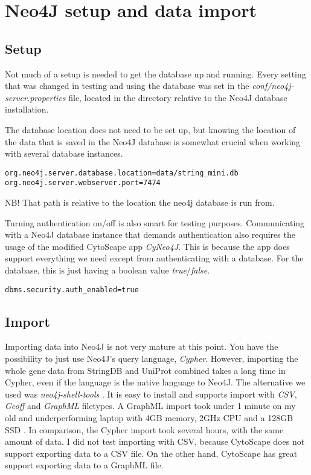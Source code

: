 \section{Neo4J setup and data import}

\subsection{Setup}
Not much of a setup is needed to get the database up and running. Every setting
that was changed in testing and using the database was set in the
\textit{conf/neo4j-server.properties} file, located in the directory relative to
the Neo4J database installation.

The database
location does not need to be set up, but knowing the location of the data that
is saved in the Neo4J database is somewhat crucial when working with several
database instances.

\begin{verbatim}
org.neo4j.server.database.location=data/string_mini.db
org.neo4j.server.webserver.port=7474
\end{verbatim}

NB! That path is relative to the location the neo4j database is run from.

Turning authentication on/off is also smart for testing purposes. Communicating
with a Neo4J database instance that demands authentication also requires the
usage of the modified CytoScape app \textit{CyNeo4J}. This is because the app
does support everything we need except from authenticating with a database. For
the database, this is just having a boolean value \textit{true}/\textit{false}.

\begin{verbatim}
dbms.security.auth_enabled=true
\end{verbatim}

\subsection{Import}
Importing data into Neo4J is not very mature at this point. You have the
possibility to just use Neo4J's query language, \textit{Cypher}. However,
importing the whole gene data from StringDB and UniProt combined takes a long
time in Cypher, even if the language is the native language to Neo4J. The
alternative we used was \textit{neo4j-shell-tools} \cite{neo4j-tools}. It is
easy to install and supports import with \textit{CSV}, \textit{Geoff} and
\textit{GraphML} filetypes. A GraphML import took under 1 minute on my old and
underperforming laptop with 4GB memory, 2GHz CPU and a 128GB SSD \cite{laptop}.
In comparison, the Cypher import took several hours, with the same amount of
data. I did not test importing with CSV, because CytoScape does not support
exporting data to a CSV file. On the other hand, CytoScape has great support
exporting data to a GraphML file.

